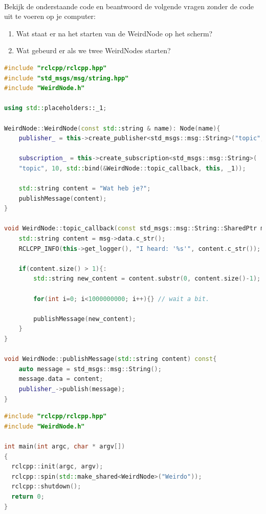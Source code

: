 \begin{exercise}\mbox{}\\
Bekijk de onderstaande code en beantwoord de volgende vragen zonder de code uit te voeren op je computer:
\begin{enumerate}
\item Wat staat er na het starten van de WeirdNode op het scherm?
\item Wat gebeurd er als we twee WeirdNodes starten?

\end{enumerate}

\begin{minipage}{0.9\linewidth}
\begin{lstlisting}[language=C++, firstnumber=0]
#include "rclcpp/rclcpp.hpp"
#include "std_msgs/msg/string.hpp"
#include "WeirdNode.h"

using std::placeholders::_1; 

WeirdNode::WeirdNode(const std::string & name): Node(name){
    publisher_ = this->create_publisher<std_msgs::msg::String>("topic", 10);

    subscription_ = this->create_subscription<std_msgs::msg::String>(
    "topic", 10, std::bind(&WeirdNode::topic_callback, this, _1));

    std::string content = "Wat heb je?";
    publishMessage(content);
}

void WeirdNode::topic_callback(const std_msgs::msg::String::SharedPtr msg) const {
    std::string content = msg->data.c_str();
    RCLCPP_INFO(this->get_logger(), "I heard: '%s'", content.c_str());

    if(content.size() > 1){:
        std::string new_content = content.substr(0, content.size()-1);
    
        for(int i=0; i<1000000000; i++){} // wait a bit.

        publishMessage(new_content);
    }
}

void WeirdNode::publishMessage(std::string content) const{
    auto message = std_msgs::msg::String();
    message.data = content;
    publisher_->publish(message);
}
\end{lstlisting}
\end{minipage}

\begin{minipage}{0.9\linewidth}
\begin{lstlisting}[language=C++, firstnumber=0]
#include "rclcpp/rclcpp.hpp"
#include "WeirdNode.h"

int main(int argc, char * argv[])
{
  rclcpp::init(argc, argv);
  rclcpp::spin(std::make_shared<WeirdNode>("Weirdo"));
  rclcpp::shutdown();
  return 0;
}
\end{lstlisting}
\end{minipage}

\end{exercise}

